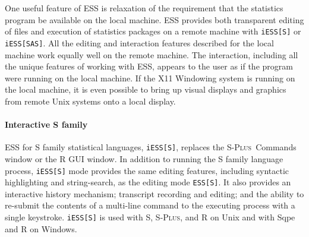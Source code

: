 \documentclass{article}
\newcommand*{\SAS}{\textsc{SAS}}
\newcommand*{\Splus}{\textsc{S-Plus}}
\newcommand*{\XLispStat}{\textsc{XLispStat}}
\newcommand*{\Stata}{\textsc{Stata}}
\newcommand{\stexttt}[1]{{\small\texttt{#1}}}
\begin{document}




One useful feature of ESS is relaxation of the requirement that the
statistics program be available on the local machine.  ESS provides
both transparent editing of files and execution of statistics packages
on a remote machine with \stexttt{iESS[S]} or \stexttt{iESS[SAS]}.
All the editing and interaction features described for the local
machine work equally well on the remote machine.  The interaction,
including all the unique features of working with ESS, appears to the
user as if the program were running on the local machine.  If the X11
Windowing system is running on the local machine, it is even possible
to bring up visual displays and graphics from remote Unix systems onto
a local display.

\paragraph{Interactive S family}
ESS for S family statistical languages, \stexttt{iESS[S]}, replaces
the \Splus\ Commands window or the R GUI window.  In addition to
running the S family language process, \stexttt{iESS[S]} mode provides
the same editing features, including syntactic highlighting and
string-search, as the editing mode \stexttt{ESS[S]}.  It also provides
an interactive history mechanism; transcript recording and editing;
and the ability to re-submit the contents of a multi-line command to
the executing process with a single keystroke.  \stexttt{iESS[S]} is
used with S, \Splus, and R on Unix and with Sqpe and R on Windows.
\end{document}
